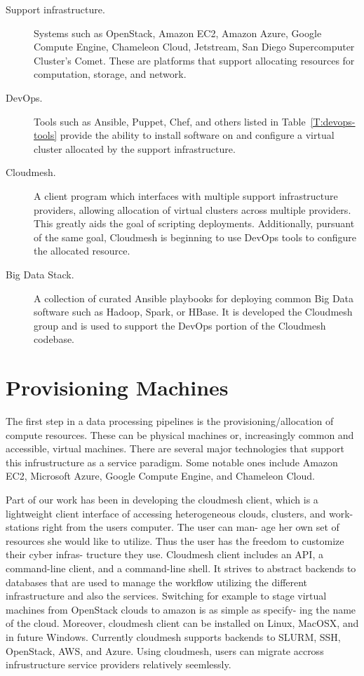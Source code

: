\documentclass[9pt,twocolumn,twoside]{styles/osajnl}
\begin{document}
\begin{description}
\item[Support infrastructure.] Systems such as OpenStack, Amazon EC2,
  Amazon Azure, Google Compute Engine, Chameleon Cloud, Jetstream, San
  Diego Supercomputer Cluster's Comet. These are platforms that
  support allocating resources for computation, storage, and network. 
\item[DevOps.] Tools such as Ansible, Puppet, Chef, and others listed
  in Table~\ref{T:devops-tools} provide the ability to install
  software on and configure a virtual cluster allocated by the support
  infrastructure.
\item[Cloudmesh.] A client program which interfaces with multiple
  support infrastructure providers, allowing allocation of virtual
  clusters across multiple providers. This greatly aids the goal of
  scripting deployments. Additionally, pursuant of the same goal,
  Cloudmesh is beginning to use DevOps tools to configure the
  allocated resource.
\item[Big Data Stack.] A collection of curated Ansible playbooks for
  deploying common Big Data software such as Hadoop, Spark, or
  HBase. It is developed the Cloudmesh group and is used to support
  the DevOps portion of the Cloudmesh codebase.
\end{description}



\section{Provisioning Machines}



The first step in a data processing pipelines is the
provisioning/allocation of compute resources. These can be physical
machines or, increasingly common and accessible, virtual
machines. There are several major technologies that support this
infrustructure as a service paradigm. Some notable ones include Amazon
EC2, Microsoft Azure, Google Compute Engine, and Chameleon Cloud.


Part of our work has been in developing the cloudmesh client, which is
a lightweight client interface of accessing heterogeneous clouds,
clusters, and work- stations right from the users computer. The user
can man- age her own set of resources she would like to utilize. Thus
the user has the freedom to customize their cyber infras- tructure
they use. Cloudmesh client includes an API, a command-line client, and
a command-line shell. It strives to abstract backends to databases
that are used to manage the workflow utilizing the different
infrastructure and also the services. Switching for example to stage
virtual machines from OpenStack clouds to amazon is as simple as
specify- ing the name of the cloud. Moreover, cloudmesh client can be
installed on Linux, MacOSX, and in future Windows.  Currently
cloudmesh supports backends to SLURM, SSH, OpenStack, AWS, and
Azure. Using cloudmesh, users can migrate accross infrustructure
service providers relatively seemlessly.
\end{document}
